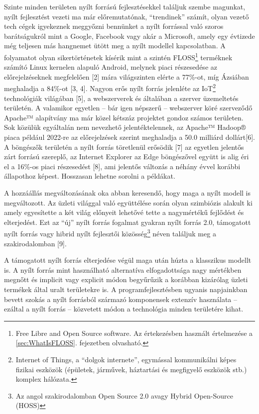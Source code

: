 \documentclass[12pt,magyar,a4paper,oneside]{scrreprt}
\begin{document}
Szinte minden területen nyílt forrású fejlesztésekkel találjuk szembe
magunkat, nyílt fejlesztést vezeti ma már előremutatónak, ``trendinek''
számít, olyan vezető tech cégek igyekeznek meggyőzni bennünket a nyílt
forrással való szoros barátságukról mint a Google, Facebook vagy akár a
Microsoft, amely egy évtizede még teljesen más hangnemet ütött meg a
nyílt modellel kapcsolatban. A folyamatot olyan sikertörténetek kísérik
mint a szintén FLOSS\footnote{Free Libre and Open Source software. Az
  értekezésben használt értelmezése a \ref{sec:WhatIsFLOSS}. fejezetben
  olvasható.} terméknek számító Linux kernelen alapuló Android, melynek
piaci részesedése az előrejelzéseknek megfelelően {[}2{]} mára
világszinten elérte a 77\%-ot, míg Ázsiában meghaladja a 84\%-ot {[}3,
4{]}. Nagyon erős nyílt forrás jelenléte az IoT\footnote{Internet of
  Things, a ``dolgok internete'', egymással kommunikálni képes fizikai
  eszközök (épületek, járművek, háztartási és megfigyelő eszközök stb.)
  komplex hálózata.} technológiák világában {[}5{]}, a webszerverek és
általában a szerver üzemeltetés területén. A valamikor egyetlen -- bár
igen népszerű -- webszerver köré szerveződő Apache™ alapítvány ma már
közel kétszáz projektet gondoz számos területen. Sok közülük egyáltalán
nem nevezhető jelentéktelennek, az Apache™ Hadoop® piaca például 2022-re
az előrejelzések szerint meghaladja a 50.0 milliárd dollárt{[}6{]}. A
böngészők területén a nyílt forrás töretlenül erősödik {[}7{]} az
egyetlen jelentős zárt forrású szereplő, az Internet Explorer az Edge
böngészővel együtt is alig éri el a 16\%-os piaci részesedést {[}8{]},
ami jelentős változás a néhány évvel korábbi állapothoz képest.
Hosszasan lehetne sorolni a példákat.

A hozzáállás megváltozásának oka abban keresendő, hogy maga a nyílt
modell is megváltozott. Az üzleti világgal való együttélése során olyan
szimbiózis alakult ki amely egyesítette a két világ előnyeit lehetővé
tette a nagymértékű fejlődést és elterjedést. Ezt az ``új'' nyílt forrás
fogalmat gyakran nyílt forrás 2.0, támogatott nyílt forrás vagy hibrid
nyílt fejlesztői közösség\footnote{Az angol szakirodalomban Open Source
  2.0 avagy Hybrid Open-Source (HOSS)} néven találjuk meg a
szakirodalomban {[}9{]}.

A támogatott nyílt forrás elterjedése végül maga után húzta a klasszikus
modellt is. A nyílt forrás mint használható alternatíva elfogadottsága
nagy mértékben megnőtt és implicit vagy explicit módon begyűrűzik a
korábban kizárólag üzleti termékek által uralt területekre is. A
programfejlesztésben ugyanis napjainkban bevett szokás a nyílt forrásból
származó komponensek extenzív használata -- ezáltal a nyílt forrás --
közvetett módon a technológia minden területére kihat.
\end{document}
